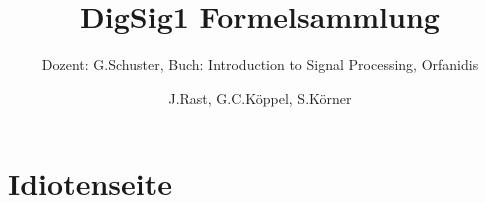 \documentclass{scrartcl}
\title{DigSig1 Formelsammlung}
\subtitle{Dozent: G.Schuster, Buch: Introduction to Signal Processing, Orfanidis}
\author{J.Rast, G.C.Köppel, S.Körner}
\begin{document}
\begin{titlepage}
	\maketitle
	\thispagestyle{empty}
\end{titlepage}
\newpage

\tableofcontents
\newpage


\newpage




\newpage

\newpage


\newpage
\section{Idiotenseite}






\newpage



\end{document}
